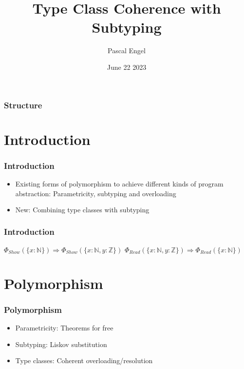 \documentclass{beamer}
\title{Type Class Coherence with Subtyping}
\author{Pascal Engel}
\date{June 22 2023}
\newcommand\Nat{\mathbb{N}}
\newcommand\Int{\mathbb{Z}}
\begin{document}
\begin{frame}
    \maketitle
\end{frame}

\begin{frame}
    \frametitle{Structure}
    \tableofcontents
\end{frame}

\section{Introduction}

\begin{frame}
    \frametitle{Introduction}

    \begin{itemize}
        \item Existing forms of polymorphism to achieve different kinds of program abstraction: Parametricity, subtyping and overloading
        \item New: Combining type classes with subtyping
    \end{itemize}
\end{frame}

\begin{frame}
  \frametitle{Introduction}

  $\Phi_{\mathit{Show}}(\{ x : \Nat \}) \Rightarrow  \Phi_{\mathit{Show}}(\{ x : \Nat, y : \Int \})$
  $\Phi_{\mathit{Read}}(\{ x : \Nat, y : \Int \}) \Rightarrow  \Phi_{\mathit{Read}}(\{ x : \Nat \})$
\end{frame}

\section{Polymorphism}

\begin{frame}
    \frametitle{Polymorphism}

    \begin{itemize}
      \item Parametricity: Theorems for free \cite{wadlertheorems}
      \item Subtyping: Liskov substitution \cite{liskov}
      \item Type classes: Coherent overloading/resolution \cite{reynolds_coherence}
    \end{itemize}
\end{frame}
\end{document}
